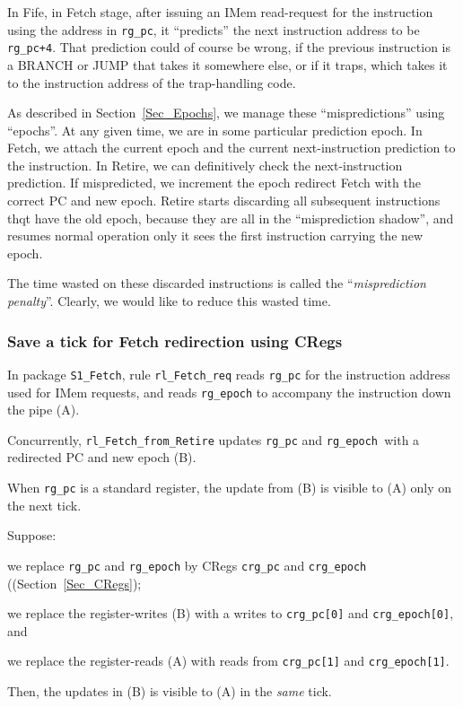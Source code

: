 \label{Sec_misprediction_penalty}

In Fife, in Fetch stage, after issuing an IMem read-request for the
instruction using the address in \verb|rg_pc|, it ``predicts'' the
next instruction address to be \verb|rg_pc+4|.  That prediction could
of course be wrong, if the previous instruction is a BRANCH or JUMP
that takes it somewhere else, or if it traps, which takes it to the
instruction address of the trap-handling code.

As described in Section~\ref{Sec_Epochs}, we manage these
``mispredictions'' using ``epochs''.  At any given time, we are in
some particular prediction epoch.  In Fetch, we attach the current
epoch and the current next-instruction prediction to the
instruction. In Retire, we can definitively check the next-instruction
prediction.  If mispredicted, we increment the epoch redirect Fetch
with the correct PC and new epoch.  Retire starts discarding all
subsequent instructions thqt have the old epoch, because they are all
in the ``misprediction shadow'', and resumes normal operation only it
sees the first instruction carrying the new epoch.


The time wasted on these discarded instructions is called the
``\emph{misprediction penalty}''.  Clearly, we would like to reduce
this wasted time.


\subsubsection{Save a tick for Fetch redirection using CRegs}

In package \verb|S1_Fetch|, rule \verb|rl_Fetch_req| reads
\verb|rg_pc| for the instruction address used for IMem requests, and
reads \verb|rg_epoch| to accompany the instruction down the pipe (A).

Concurrently, \verb|rl_Fetch_from_Retire| updates \verb|rg_pc| and
\verb|rg_epoch |with a redirected PC and new epoch (B).

When \verb|rg_pc| is a standard register, the update from (B) is
visible to (A) only on the next tick.

Suppose:
\begin{tightlist}

 \item we replace \verb|rg_pc| and \verb|rg_epoch| by CRegs \verb|crg_pc|
       and \verb|crg_epoch| ((Section~\ref{Sec_CRegs});

 \item we replace the register-writes (B) with a writes to \verb|crg_pc[0]|
       and \verb|crg_epoch[0]|, and

 \item we replace the register-reads (A) with reads from
       \verb|crg_pc[1]| and \verb|crg_epoch[1]|.

\end{tightlist}
Then, the updates in (B) is visible to (A) in the \emph{same} tick.

